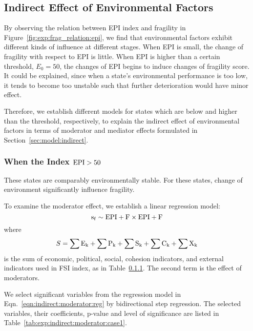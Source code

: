 \subsection{Indirect Effect of Environmental Factors}
By observing the relation between EPI index and fragility in Figure~\ref{fig:exp:frag_relation:epi}, we find that environmental factors exhibit different kinds of influence at different stages. 
When EPI is small, the change of fragility with respect to EPI is little. When EPI is higher than a certain threshold, $E_0=50$, the changes of EPI begins to induce changes of fragility score. It could be explained, since when a state's environmental performance is too low, it tends to become too unstable such that further deterioration would have minor effect.  

Therefore, we establish different models for states which are below and higher than the threshold, respectively, to explain the indirect effect of environmental factors in terms of moderator and mediator effects formulated in Section~\ref{sec:model:indirect}.

\subsubsection{When the Index $\rm{EPI} > 50$}
These states are comparably environmentally stable. For these states, change of environment significantly influence fragility. 

To examine the moderator effect, we establish a linear regression model:
\begin{equation}
    \operatorname*{s_f} \sim \rm{EPI} + F \times\rm{EPI}+ F
    \label{eqn:indirect:moderator:reg} 
\end{equation}
where
\begin{equation}
   S= \sum\rm{E}_k + \sum\rm{P}_k + \sum\rm{S}_k + \sum\rm{C}_k + \sum\rm{X}_k
\end{equation}
is the sum of economic, political, social, cohesion indicators, and external indicators used in FSI index, as in Table~\ref{}. 
The second term is the effect of moderators. 

We select significant variables from the regression model in Eqn.~\ref{eqn:indirect:moderator:reg} by bidirectional step regression. The selected variables, their coefficients, p-value and level of significance are listed in Table~\ref{tab:exp:indirect:moderator:case1}.

